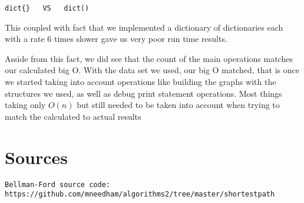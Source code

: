 \documentclass{article}
\begin{document}
\begin{verbatim}
dict{}   VS   dict()
\end{verbatim}

This coupled with fact that we implemented a dictionary of dictionaries each with a rate 6 times slower gave us very poor run time results.

Asside from this fact, we did see that the count of the main operations matches our calculated big O. With the data set we used, our big O matched, that is once we started taking into account operations like building the graphs with the structures we used, as well as debug print statement operations. Most things taking only $O(n)$ but still needed to be taken into account when trying to match the calculated to actual results
\section{Sources}

\begin{verbatim}
Bellman-Ford source code:
https://github.com/mneedham/algorithms2/tree/master/shortestpath
\end{verbatim}
\end{document}
